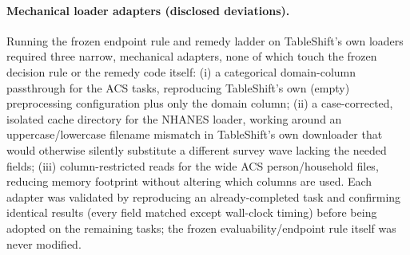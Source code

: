 \documentclass[11pt]{article}
\begin{document}
\paragraph{Mechanical loader adapters (disclosed deviations).} Running the frozen endpoint rule and remedy
ladder on TableShift's own loaders required three narrow, mechanical adapters, none of which touch the
frozen decision rule or the remedy code itself: (i) a categorical domain-column passthrough for the ACS
tasks, reproducing TableShift's own (empty) preprocessing configuration plus only the domain column; (ii) a
case-corrected, isolated cache directory for the NHANES loader, working around an uppercase/lowercase
filename mismatch in TableShift's own downloader that would otherwise silently substitute a different
survey wave lacking the needed fields; (iii) column-restricted reads for the wide ACS person/household
files, reducing memory footprint without altering which columns are used. Each adapter was validated by
reproducing an already-completed task and confirming identical results (every field matched except
wall-clock timing) before being adopted on the remaining tasks; the frozen evaluability/endpoint rule itself
was never modified.
\end{document}
